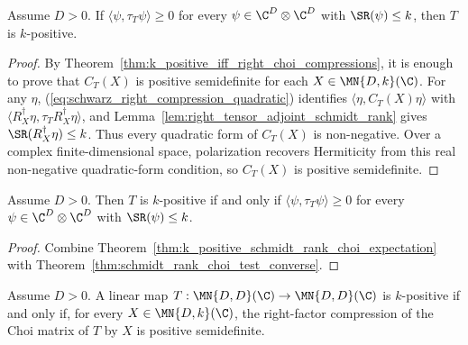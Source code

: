 \begin{theorem}
    \label{thm:schmidt_rank_choi_test_converse}
    \leanok
    Assume $D>0$. If $\langle\psi,\tau_T\psi\rangle\ge0$ for every
    $\psi\in\C^D\otimes\C^D$ with $\SR(\psi)\le k$, then $T$ is
    $k$-positive.
\end{theorem}

\begin{proof}
    \leanok
    By Theorem~\ref{thm:k_positive_iff_right_choi_compressions}, it is enough
    to prove that $C_T(X)$ is positive semidefinite for each
    $X\in\MN{D,k}(\C)$. For any $\eta$,
    (\ref{eq:schwarz_right_compression_quadratic}) identifies
    $\langle\eta,C_T(X)\eta\rangle$ with
    $\langle R_X^\dagger\eta,\tau_T R_X^\dagger\eta\rangle$, and
    Lemma~\ref{lem:right_tensor_adjoint_schmidt_rank} gives
    $\SR(R_X^\dagger\eta)\le k$. Thus every quadratic form of $C_T(X)$ is
    non-negative. Over a complex finite-dimensional space, polarization
    recovers Hermiticity from this real non-negative quadratic-form condition,
    so $C_T(X)$ is positive semidefinite.
\end{proof}

\begin{theorem}
    \label{thm:schmidt_rank_choi_test_iff}
    \leanok
    Assume $D>0$. Then $T$ is $k$-positive if and only if
    $\langle\psi,\tau_T\psi\rangle\ge0$ for every
    $\psi\in\C^D\otimes\C^D$ with $\SR(\psi)\le k$.
\end{theorem}

\begin{proof}
    \leanok
    Combine Theorem~\ref{thm:k_positive_schmidt_rank_choi_expectation} with
    Theorem~\ref{thm:schmidt_rank_choi_test_converse}.
\end{proof}
\begin{theorem}
    \label{thm:k_positive_iff_right_choi_compressions}
    \leanok
    Assume $D>0$. A linear map
    $T:\MN{D,D}(\C)\to\MN{D,D}(\C)$ is $k$-positive if and only if, for every
    $X\in\MN{D,k}(\C)$, the right-factor compression of the Choi matrix of
    $T$ by $X$ is positive semidefinite.
\end{theorem}

